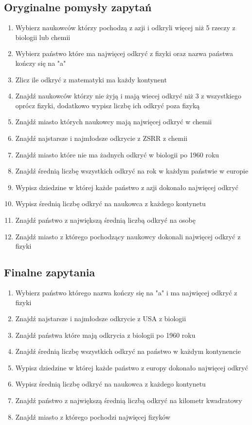\documentclass[11pt]{article}
\begin{document}
	\subsection{Oryginalne pomysły zapytań}
		\begin{enumerate}
			\item Wybierz naukowców którzy pochodzą z azji i odkryli więcej niż 5 rzeczy z biologii lub chemii
			\item Wybierz państwo które ma najwięcej odkryć z fizyki oraz nazwa państwa kończy się na "a"
			\item Zlicz ile odkryć z matematyki ma każdy kontynent
			\item Znajdź naukowców którzy nie żyją i mają wiecej odkryć niż 3 z wszystkiego oprócz fizyki, dodatkowo wypisz liczbę ich odkryć poza fizyką
			\item Znajdź miasto których naukowcy mają najwięcej odkryć w chemii
			\item Znajdź najstarsze i najmłodsze odkrycie z ZSRR z chemii
			\item Znajdź miasto które nie ma żadnych odkryć w biologii po 1960 roku
			\item Znajdź średnią liczbę wszystkich odkryć na rok w każdym państwie w europie
			\item Wypisz dziedzine w której każde państwo z azji dokonało najwięcej odkryć
			\item Wypisz średnią liczbę odkryć na naukowca z każdego kontynetu
			\item Znajdź państwo z największą średnią liczbą odkryć na osobę
			\item Znajdź miasto z którego pochodzący naukowcy dokonali najwięcej odkryć z fizyki
		\end{enumerate}
	\subsection{Finalne zapytania}
		\begin{enumerate}
			\item  Wybierz państwo którego nazwa kończy się na "a" i ma najwięcej odkryć z fizyki
			\item Znajdź najstarsze i najmłodsze odkrycie z USA z biologii
			\item Znajdź państwa które mają odkrycia z biologii po 1960 roku
			\item Znajdź średnią liczbę wszystkich odkryć na państwo w każdym kontynencie
			\item  Wypisz dziedzine w której każde państwo z europy dokonało najwięcej odkryć
			\item  Wypisz średnią liczbę odkryć na naukowca z każdego kontynetu
			\item  Znajdź państwo z największą średnią liczbą odkryć na kilometr kwadratowy
			\item Znajdź miasto z którego pochodzi najwięcej fizyków
		\end{enumerate}
\end{document}
